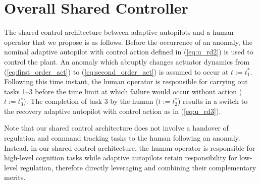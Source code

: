 \section{Overall Shared Controller}\label{subsec:sc_overall}
The shared control architecture between adaptive autopilots and a human operator that we propose is as follows. Before the occurrence of an anomaly, the nominal adaptive autopilot with control action defined in (\ref{eq:u_rd2}) is used to control the plant. An anomaly which abruptly changes actuator dynamics from (\ref{eq:first_order_act}) to (\ref{eq:second_order_act}) is assumed to occur at $t := t_1^*$. Following this time instant, the human operator is responsible for carrying out tasks 1--3 before the time limit at which failure would occur without action ($t:=t_3^*$). The completion of task 3 by the human ($t := t_2^*$) results in a switch to the recovery adaptive autopilot with control action as in (\ref{eq:u_rd3}). 

Note that our shared control architecture does not involve a handover of regulation and command tracking tasks to the human following an anomaly. Instead, in our shared control architecture, the human operator is responsible for high-level cognition tasks while adaptive autopilots retain responsibility for low-level regulation, therefore directly leveraging and combining their complementary merits.

